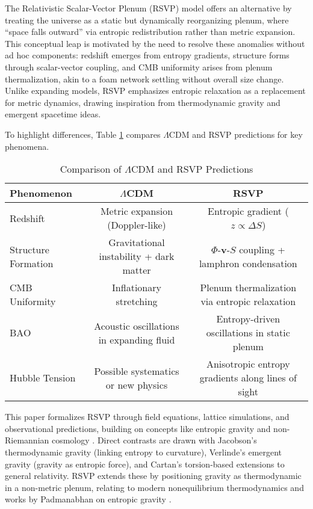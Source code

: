 \documentclass[11pt]{article}
\theoremstyle{plain}
\theoremstyle{definition}
\begin{document}
The Relativistic Scalar-Vector Plenum (RSVP) model offers an alternative by treating the universe as a static but dynamically reorganizing plenum, where ``space falls outward'' via entropic redistribution rather than metric expansion. This conceptual leap is motivated by the need to resolve these anomalies without ad hoc components: redshift emerges from entropy gradients, structure forms through scalar-vector coupling, and CMB uniformity arises from plenum thermalization, akin to a foam network settling without overall size change. Unlike expanding models, RSVP emphasizes entropic relaxation as a replacement for metric dynamics, drawing inspiration from thermodynamic gravity \citep{Jacobson1995} and emergent spacetime ideas.

To highlight differences, Table \ref{tab:comparison} compares $\Lambda$CDM and RSVP predictions for key phenomena.

\begin{table}[ht]
\centering
\caption{Comparison of $\Lambda$CDM and RSVP Predictions}
\label{tab:comparison}
\begin{tabular}{lcc}
\toprule
Phenomenon & $\Lambda$CDM & RSVP \\
\midrule
Redshift & Metric expansion (Doppler-like) & Entropic gradient ($z \propto \Delta S$) \\
Structure Formation & Gravitational instability + dark matter & $\Phi$-$\bm{v}$-$S$ coupling + lamphron condensation \\
CMB Uniformity & Inflationary stretching & Plenum thermalization via entropic relaxation \\
BAO & Acoustic oscillations in expanding fluid & Entropy-driven oscillations in static plenum \\
Hubble Tension & Possible systematics or new physics & Anisotropic entropy gradients along lines of sight \\
\bottomrule
\end{tabular}
\end{table}

This paper formalizes RSVP through field equations, lattice simulations, and observational predictions, building on concepts like entropic gravity \citep{Verlinde2011} and non-Riemannian cosmology \citep{Shao2023}. Direct contrasts are drawn with Jacobson's thermodynamic gravity (linking entropy to curvature), Verlinde's emergent gravity (gravity as entropic force), and Cartan's torsion-based extensions to general relativity. RSVP extends these by positioning gravity as thermodynamic in a non-metric plenum, relating to modern nonequilibrium thermodynamics and works by Padmanabhan on entropic gravity \citep{Padmanabhan2015}.
\end{document}
